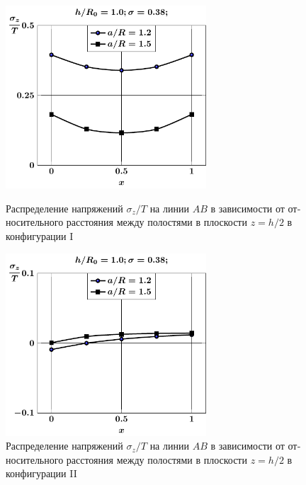 \begin{russian}
\begin{figure}
\centering\footnotesize
\parbox[b]{7.5cm}{\centering\includegraphics[width=7.5cm]{cav2-a-h10-r10-z1-sig_z.pdf}
\caption{Распределение напряжений $\sigma_z/T$ на линии $AB$ в зависимости от относительного расстояния между полостями в плоскости $z=h/2$ в конфигурации I
\label{f:7:93}}}\hfil\hfil
\parbox[b]{7.5cm}{\centering\includegraphics[width=7.5cm]{cav2a-a-h10-r10-z1-sig_z.pdf}
\caption{Распределение напряжений $\sigma_z/T$ на линии $AB$ в зависимости от относительного расстояния между полостями в плоскости $z=h/2$ в конфигурации II
\label{f:7:94}}}
\end{figure}


\end{russian}
